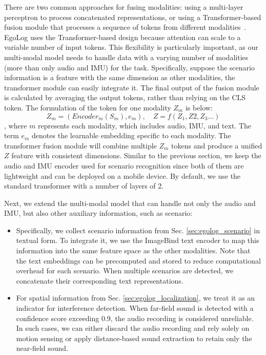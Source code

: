 There are two common approaches for fusing modalities: using a multi-layer perceptron to process concatenated representations, or using a Transformer-based fusion module that processes a sequence of tokens from different modalities~\citep{gabeur2020multi}. EgoLog uses the Transformer-based design because attention can scale to a variable number of input tokens.
This flexibility is particularly important, as our multi-modal model needs to handle data with a varying number of modalities (more than only audio and IMU) for the task. Specifically, suppose the scenario information is a feature with the same dimension as other modalities, the transformer module can easily integrate it.
The final output of the fusion module is calculated by averaging the output tokens, rather than relying on the CLS token. The formulation of the token for one modality $Z_m$ is below:
\[
Z_m = (Encoder_m(S_m), e_m), \quad Z=f(Z_1, Z2, Z_3...)
\], where \( m \) represents each modality, which includes audio, IMU, and text. The term \( e_m \) denotes the learnable embedding specific to each modality. The transformer fusion module will combine multiple \( Z_m \) tokens and produce a unified \( Z \) feature with consistent dimensions. 
Similar to the previous section, we keep the audio and IMU encoder used for scenario recognition since both of them are lightweight and can be deployed on a mobile device.
By default, we use the standard transformer with a number of layers of 2. 

Next, we extend the multi-modal model that can handle not only the audio and IMU, but also other auxiliary information, such as scenario:
\begin{itemize}
    \item Specifically, we collect scenario information from Sec. \ref{sec:egolog_scenario} in textual form. To integrate it, we use the ImageBind \citep{girdhar2023imagebind} text encoder to map this information into the same feature space as the other modalities. Note that the text embeddings can be precomputed and stored to reduce computational overhead for each scenario. When multiple scenarios are detected, we concatenate their corresponding text representations.

    \item For spatial information from Sec. \ref{sec:egolog_localization}, we treat it as an indicator for interference detection. When far-field sound is detected with a confidence score exceeding 0.9, the audio recording is considered unreliable. In such cases, we can either discard the audio recording and rely solely on motion sensing or apply distance-based sound extraction \citep{chen2024hearable} to retain only the near-field sound.
\end{itemize} 


